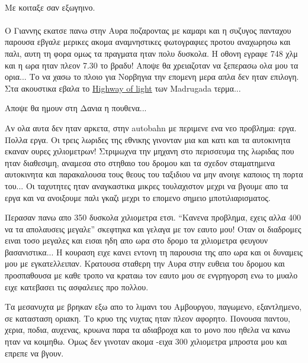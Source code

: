\\

\noindent Με κοιταξε σαν εξωγηινο.\\

\\

Ο Γιαννης εκατσε πανω στην Αυρα ποζαροντας με καμαρι και η συζυγος πανταχου παρουσα εβγαλε μερικες ακομα αναμνηστικες φωτογραφιες προτου αναχωρησω και παλι, αυτη τη φορα ομως τα πραγματα ηταν πολυ δυσκολα. Η οθονη εγραφε 748 χλμ και η ωρα ηταν πλεον 7.30 το βραδυ! Αποψε θα χρειαζοταν να ξεπερασω ολα μου τα ορια... Το να χασω το πλοιο για Νορβηγια την επομενη μερα απλα δεν ηταν επιλογη. 
Στα ακουστικα εβαλα το \href{http://www.youtube.com/watch?v=g5vYEAUIcLM}{Highway of light} των Madrugada τερμα...

Αποψε θα ημουν στη Δανια η πουθενα...


Αν ολα αυτα δεν ηταν αρκετα, στην autobahn με περιμενε ενα νεο προβλημα: εργα. Πολλα εργα. Οι τρεις λωριδες της εθνικης γινονταν μια και κατι και τα αυτοκινητα εκαναν ουρες χιλιομετρων! Στριμωχνα την μηχανη στο περισσευμα της λωριδας που ηταν διαθεσιμη, αναμεσα στο στηθαιο του δρομου και τα σχεδον σταματημενα αυτοκινητα και παρακαλουσα τους θεους του ταξιδιου να μην ανοιγε καποιος τη πορτα του... Οι ταχυτητες ηταν αναγκαστικα μικρες τουλαχιστον μεχρι να βγουμε απο τα εργα και να ανοιξουμε παλι γκαζι μεχρι το επομενο σημειο μποτιλιαρισματος.

Περασαν πανω απο 350 δυσκολα χιλιομετρα ετσι. ``Κανενα προβλημα, εχεις αλλα 400 να τα απολαυσεις μεγαλε'' σκεφτηκα και γελαγα με τον εαυτο μου!
Οταν οι διαδρομες ειναι τοσο μεγαλες και εισαι ηδη απο ωρα στο δρομο τα χιλιομετρα φευγουν βασανιστικα...
Η κουραση ειχε κανει εντονη τη παρουσια της απο ωρα και οι δυναμεις μου με εγκατελλειπαν. Κρατουσα σταθερη την Αυρα στην ευθεια του δρομου και προσπαθουσα με καθε τροπο να κραταω τον εαυτο μου σε ενγρηγορση ενω το μυαλο ειχε κατεβασει τις ασφαλειες προ πολλου.

Τα μεσανυχτα με βρηκαν εξω απο το λιμανι του Αμβουργου, παγωμενο, εξαντλημενο, σε κατασταση οριακη. Το κρυο της νυχτας ηταν πλεον αφορητο. Πονουσα παντου, χερια, ποδια, αυχενας, κρυωνα παρα τα αδιαβροχα και το μονο που ηθελα να κανω ηταν να κοιμηθω. Ομως δεν γινοταν ακομα -ειχα 300 χιλιομετρα μπροστα μου και επρεπε να βγουν.

